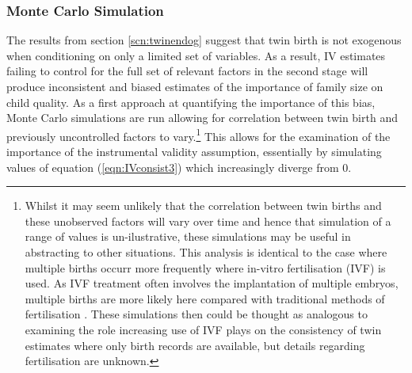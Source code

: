 \documentclass{article}[11pt,subeqn]
\begin{document}
\begin{spacing}{1.5}
\subsubsection{Monte Carlo Simulation}
\label{scn:MCS}
The results from section \ref{scn:twinendog} suggest that twin birth is not exogenous when conditioning on only a limited set of variables. As a result, 
IV estimates failing to control for the full set of 
relevant factors in the second stage will produce inconsistent and biased estimates of the importance of family size on child quality.  As a first 
approach at quantifying the importance of this bias, Monte Carlo simulations are run allowing for correlation between twin birth and previously uncontrolled factors
to vary.\footnote{Whilst it may seem unlikely that the correlation between twin births and these unobserved factors will vary over time and hence that
simulation of a range of values is un-ilustrative, these simulations may be useful in abstracting to other situations.  This analysis is identical to the
case where multiple births occurr more frequently where in-vitro fertilisation (IVF) is used.  As IVF treatment often involves the implantation of 
multiple embryos, multiple births are more likely here compared with traditional methods of fertilisation \citep{Beraletal1990}.  These simulations then could be 
thought as analogous to examining the role increasing use of IVF plays on the consistency of twin estimates where only birth records are available, 
but details regarding fertilisation are unknown.}  This allows for the examination of the importance of the instrumental validity assumption, essentially
by simulating values of equation (\ref{eqn:IVconsist3}) which increasingly diverge from 0. 


\end{spacing}
\end{document}
